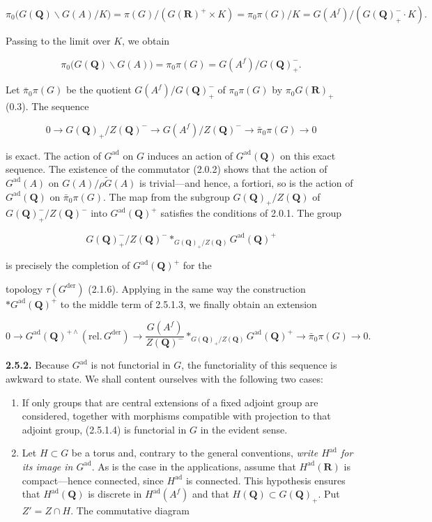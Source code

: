 \documentclass[10pt,a4paper]{article}
\newcommand{\SourcePage}[2]{\clearpage\setcounter{page}{#2}\typeout{D031_SOURCE_PAGE physical=#1 printed=#2}}
\begin{document}
\[
\pi_0\bigl(G(\mathbf Q)\backslash G(A)/K\bigr)
=\pi(G)/(G(\mathbf R)^+\times K)
=\pi_0\pi(G)/K
=G(A^f)/(G(\mathbf Q)_+^{-}\cdot K). \tag{2.5.1.2}
\]

Passing to the limit over \(K\), we obtain

\[
\pi_0\bigl(G(\mathbf Q)\backslash G(A)\bigr)=\pi_0\pi(G)=G(A^f)/G(\mathbf Q)_+^{-}.
\]

Let \(\bar\pi_0\pi(G)\) be the quotient \(G(A^f)/G(\mathbf Q)_+^{-}\) of \(\pi_0\pi(G)\) by \(\pi_0G(\mathbf R)_+\) (0.3). The sequence

\[
0\longrightarrow G(\mathbf Q)_+/Z(\mathbf Q)^{-}
\longrightarrow G(A^f)/Z(\mathbf Q)^{-}
\longrightarrow\bar\pi_0\pi(G)\longrightarrow0 \tag{2.5.1.3}
\]

is exact. The action of \(G^{\mathrm{ad}}\) on \(G\) induces an action of \(G^{\mathrm{ad}}(\mathbf Q)\) on this exact sequence. The existence of the commutator (2.0.2) shows that the action of \(G^{\mathrm{ad}}(A)\) on \(G(A)/\rho\widetilde G(A)\) is trivial---and hence, a fortiori, so is the action of \(G^{\mathrm{ad}}(\mathbf Q)\) on \(\bar\pi_0\pi(G)\). The map from the subgroup \(G(\mathbf Q)_+/Z(\mathbf Q)\) of \(G(\mathbf Q)_+^{-}/Z(\mathbf Q)^{-}\) into \(G^{\mathrm{ad}}(\mathbf Q)^+\) satisfies the conditions of 2.0.1. The group

\[
G(\mathbf Q)_+^{-}/Z(\mathbf Q)^{-}
*_{G(\mathbf Q)_+/Z(\mathbf Q)}G^{\mathrm{ad}}(\mathbf Q)^+
\]

is precisely the completion of \(G^{\mathrm{ad}}(\mathbf Q)^+\) for the

\SourcePage{35}{281}
topology \(\tau(G^{\mathrm{der}})\) (2.1.6). Applying in the same way the construction \(*G^{\mathrm{ad}}(\mathbf Q)^+\) to the middle term of 2.5.1.3, we finally obtain an extension

\[
\tag{2.5.1.4}
0\longrightarrow G^{\mathrm{ad}}(\mathbf Q)^{+\wedge}(\mathrm{rel.}\,G^{\mathrm{der}})
\longrightarrow \frac{G(A^f)}{Z(\mathbf Q)^{-}}
*_{G(\mathbf Q)_+/Z(\mathbf Q)}G^{\mathrm{ad}}(\mathbf Q)^+
\longrightarrow\bar\pi_0\pi(G)\longrightarrow0.
\]

\textbf{2.5.2.} Because \(G^{\mathrm{ad}}\) is not functorial in \(G\), the functoriality of this sequence is awkward to state. We shall content ourselves with the following two cases:

\begin{enumerate}
\def\labelenumi{(\alph{enumi})}
\item
  If only groups that are central extensions of a fixed adjoint group are considered, together with morphisms compatible with projection to that adjoint group, (2.5.1.4) is functorial in \(G\) in the evident sense.
\item
  Let \(H\subset G\) be a torus and, contrary to the general conventions, \emph{write \(H^{\mathrm{ad}}\) for its image in \(G^{\mathrm{ad}}\)}. As is the case in the applications, assume that \(H^{\mathrm{ad}}(\mathbf R)\) is compact---hence connected, since \(H^{\mathrm{ad}}\) is connected. This hypothesis ensures that \(H^{\mathrm{ad}}(\mathbf Q)\) is discrete in \(H^{\mathrm{ad}}(A^f)\) and that \(H(\mathbf Q)\subset G(\mathbf Q)_+\). Put \(Z'=Z\cap H\). The commutative diagram
\end{enumerate}
\end{document}
